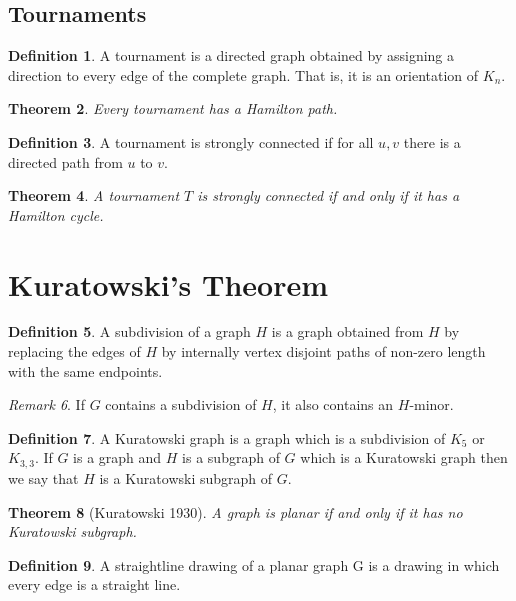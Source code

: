 \documentclass[11pt, fleqn, a4paper, landscape]{article}
\theoremstyle{plain} %
\newtheorem{thm}{Theorem}
\theoremstyle{remark} %
\newtheorem{rem}[thm]{Remark}
\theoremstyle{definition} %
\newtheorem{defi}[thm]{Definition}
\begin{document}
\begin{multicols}{3}
\subsection{Tournaments}
\begin{defi}
A tournament is a directed graph obtained by assigning a direction to every
edge of the complete graph. That is, it is an orientation of $K_n$.
\end{defi}

\begin{thm}
Every tournament has a Hamilton path.
\end{thm}

\begin{defi}
A tournament is strongly connected if for all $u, v$ there is a directed path from $u$ to $v$.
\end{defi}
\begin{thm}
A tournament $T$ is strongly connected if and only if it has a Hamilton cycle.
\end{thm}

\section{Kuratowski’s Theorem}

\begin{defi}
A subdivision of a graph $H$ is a graph obtained from $H$ by replacing the edges of $H$ by internally vertex disjoint paths of non-zero length with the same endpoints.
\end{defi}
\addtocounter{thm}{1}
\begin{rem}
If $G$ contains a subdivision of $H$, it also contains an $H$-minor.
\end{rem}

\begin{defi}
A Kuratowski graph is a graph which is a subdivision of $K_5$ or $K_{3,3}$. If $G$ is a graph and $H$ is a subgraph of $G$ which is a Kuratowski graph then we say that $H$ is a Kuratowski subgraph of $G$.
\end{defi}

\begin{thm}[Kuratowski 1930]
A graph is planar if and only if it has no Kuratowski subgraph.
\end{thm}

\begin{defi}
A straightline drawing of a planar graph G is a drawing in which every edge is a straight line.
\end{defi}


\end{multicols}
\end{document}
